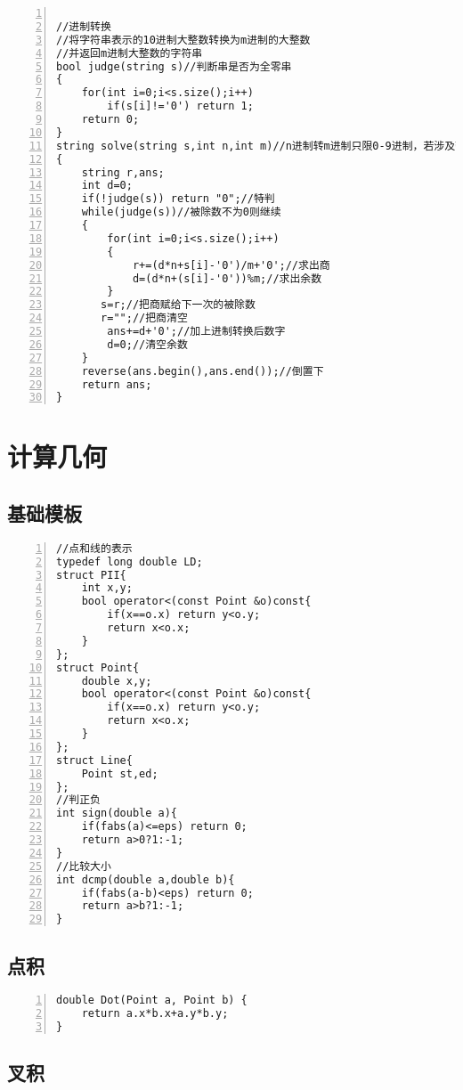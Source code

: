 \begin{lstlisting}[language={[ANSI]C},numbers=left]

//进制转换
//将字符串表示的10进制大整数转换为m进制的大整数
//并返回m进制大整数的字符串
bool judge(string s)//判断串是否为全零串
{
    for(int i=0;i<s.size();i++)
        if(s[i]!='0') return 1;
    return 0;
}
string solve(string s,int n,int m)//n进制转m进制只限0-9进制，若涉及带字母的进制，稍作修改即可
{
    string r,ans;
    int d=0;
    if(!judge(s)) return "0";//特判
    while(judge(s))//被除数不为0则继续
    {
        for(int i=0;i<s.size();i++)
        {
            r+=(d*n+s[i]-'0')/m+'0';//求出商
            d=(d*n+(s[i]-'0'))%m;//求出余数
        }
       s=r;//把商赋给下一次的被除数
       r="";//把商清空
        ans+=d+'0';//加上进制转换后数字
        d=0;//清空余数
    }
    reverse(ans.begin(),ans.end());//倒置下
    return ans;
}
\end{lstlisting}


\section{计算几何}

\subsection{基础模板}
\begin{lstlisting}[language={[ANSI]C},numbers=left]
//点和线的表示
typedef long double LD;
struct PII{
	int x,y;
	bool operator<(const Point &o)const{
		if(x==o.x) return y<o.y;
		return x<o.x;
	}
};
struct Point{
	double x,y;
	bool operator<(const Point &o)const{
		if(x==o.x) return y<o.y;
		return x<o.x;
	}
};
struct Line{
	Point st,ed;
};
//判正负
int sign(double a){
	if(fabs(a)<=eps) return 0;
	return a>0?1:-1;
}
//比较大小
int dcmp(double a,double b){
	if(fabs(a-b)<eps) return 0;
	return a>b?1:-1;
}
\end{lstlisting}

\subsection{点积}
\begin{lstlisting}[language={[ANSI]C},numbers=left]
double Dot(Point a, Point b) {
	return a.x*b.x+a.y*b.y;
}
\end{lstlisting}

\subsection{叉积}

